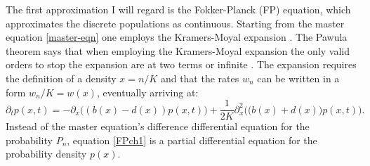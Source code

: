 The first approximation I will regard is the Fokker-Planck (FP) equation, which approximates the discrete populations as continuous. 
Starting from the master equation \ref{master-eqn} one employs the Kramers-Moyal expansion \cite{Gardiner2004}. 
The Pawula theorem says that when employing the Kramers-Moyal expansion the only valid orders to stop the expansion are at two terms or infinite \cite{VanKampen1992}. 
The expansion requires the definition of a density $x=n/K$ and that the rates $w_n$ can be written in a form $w_n/K = w(x)$, eventually arriving at:
\begin{equation}
\partial_t p(x,t) = - \partial_x\Big( (b(x) - d(x)) p(x,t) \Big) + \frac{1}{2 K} \partial_x^2 \Big( \big(b(x) + d(x)\big) p(x,t) \Big). 
 \label{FPch1}
\end{equation}
Instead of the master equation's difference differential equation for the probability $P_n$, equation \ref{FPch1} is a partial differential equation for the probability density $p(x)$. %
